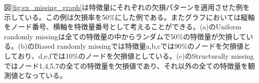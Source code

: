 図\ref{fig:ex_missing_graph}は特徴量にそれぞれの欠損パターンを適用させた例を示している。この例は欠損率を50\%にした例である。またグラフにおいては縦軸をノード番号、横軸を特徴量番号として考えることができる。(a)のUniform randomly missingは全ての特徴量の中からランダムで50\%の特徴量が欠損している。(b)のBiased randomly missingでは特徴量a,b,cでは90\%のノードを欠損値としており、d,e,fでは10\%のノードを欠損値としている。(c)のStructurally missingではノード1,4,5,7の全ての特徴量を欠損値であり、それ以外の全ての特徴量を観測値となっている。

\begin{table}[!b]
    \centering
    \caption{GCNのハイパーパラメータ設定}
    \label{tab:gcn_hyperparams}
\end{table}


